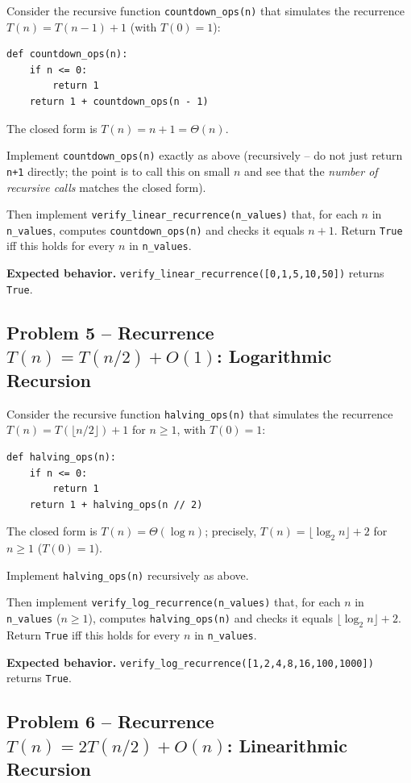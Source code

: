 \documentclass[11pt]{article}
\begin{document}
Consider the recursive function \texttt{countdown\_ops(n)} that simulates the recurrence
$T(n) = T(n-1) + 1$ (with $T(0) = 1$):
\begin{lstlisting}
def countdown_ops(n):
    if n <= 0:
        return 1
    return 1 + countdown_ops(n - 1)
\end{lstlisting}
The closed form is $T(n) = n + 1 = \Theta(n)$.

Implement \texttt{countdown\_ops(n)} exactly as above (recursively -- do not just return
\texttt{n+1} directly; the point is to call this on small $n$ and see that the
\emph{number of recursive calls} matches the closed form).

Then implement \texttt{verify\_linear\_recurrence(n\_values)} that, for each $n$ in
\texttt{n\_values}, computes \texttt{countdown\_ops(n)} and checks it equals $n+1$. Return
\texttt{True} iff this holds for every $n$ in \texttt{n\_values}.

\textbf{Expected behavior.} \texttt{verify\_linear\_recurrence([0,1,5,10,50])} returns
\texttt{True}.

\subsection*{Problem 5 -- Recurrence $T(n) = T(n/2) + O(1)$: Logarithmic Recursion}

Consider the recursive function \texttt{halving\_ops(n)} that simulates the recurrence
$T(n) = T(\lfloor n/2 \rfloor) + 1$ for $n \ge 1$, with $T(0) = 1$:
\begin{lstlisting}
def halving_ops(n):
    if n <= 0:
        return 1
    return 1 + halving_ops(n // 2)
\end{lstlisting}
The closed form is $T(n) = \Theta(\log n)$; precisely, $T(n) = \lfloor \log_2 n \rfloor + 2$
for $n \ge 1$ ($T(0)=1$).

Implement \texttt{halving\_ops(n)} recursively as above.

Then implement \texttt{verify\_log\_recurrence(n\_values)} that, for each $n$ in
\texttt{n\_values} ($n \ge 1$), computes \texttt{halving\_ops(n)} and checks it equals
$\lfloor \log_2 n \rfloor + 2$. Return \texttt{True} iff this holds for every $n$ in
\texttt{n\_values}.

\textbf{Expected behavior.} \texttt{verify\_log\_recurrence([1,2,4,8,16,100,1000])} returns
\texttt{True}.

\subsection*{Problem 6 -- Recurrence $T(n) = 2T(n/2) + O(n)$: Linearithmic Recursion}
\end{document}
